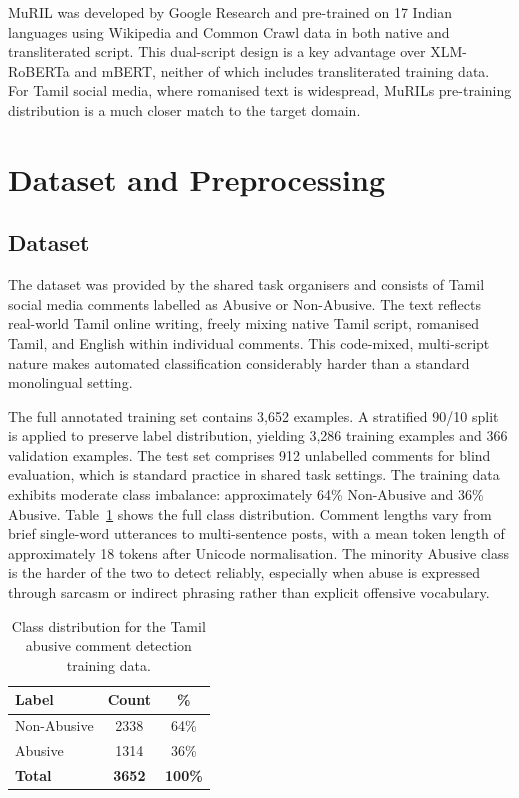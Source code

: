 \documentclass[11pt]{article}
\begin{document}
MuRIL \citep{khanuja2021} was developed by Google Research and pre-trained on 17
Indian languages using Wikipedia and Common Crawl data in both native and transliterated
script. This dual-script design is a key advantage over XLM-RoBERTa and mBERT, neither
of which includes transliterated training data. For Tamil social media, where romanised
text is widespread, MuRIL\textquotesingle{}s pre-training distribution is a much closer
match to the target domain.

\section{Dataset and Preprocessing}

\subsection{Dataset}
The dataset was provided by the shared task organisers and consists of Tamil social
media comments labelled as Abusive or Non-Abusive. The text reflects real-world Tamil
online writing, freely mixing native Tamil script, romanised Tamil, and English within
individual comments. This code-mixed, multi-script nature makes automated classification
considerably harder than a standard monolingual setting.

The full annotated training set contains 3,652 examples. A stratified 90/10 split is
applied to preserve label distribution, yielding 3,286 training examples and 366
validation examples. The test set comprises 912 unlabelled comments for blind evaluation,
which is standard practice in shared task settings. The training data exhibits moderate
class imbalance: approximately 64\% Non-Abusive and 36\% Abusive. Table~\ref{tab:dist}
shows the full class distribution. Comment lengths vary from brief single-word
utterances to multi-sentence posts, with a mean token length of approximately 18 tokens
after Unicode normalisation. The minority Abusive class is the harder of the two to
detect reliably, especially when abuse is expressed through sarcasm or indirect phrasing
rather than explicit offensive vocabulary.

\begin{table}[H]
\centering\small
\setlength{\tabcolsep}{6pt}\renewcommand{\arraystretch}{1.1}
\begin{tabular}{lcc}
\toprule
\rowcolor{headerblue}\textbf{Label} & \textbf{Count} & \textbf{\%} \\
\midrule
Non-Abusive & 2338 & 64\% \\
Abusive     & 1314 & 36\% \\
\midrule
\textbf{Total} & \textbf{3652} & \textbf{100\%} \\
\bottomrule
\end{tabular}
\caption{Class distribution for the Tamil abusive comment detection training data.}
\label{tab:dist}
\end{table}
\end{document}
